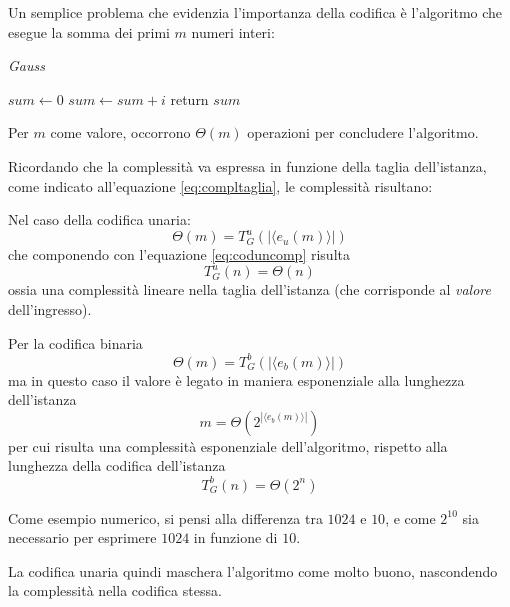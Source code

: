 Un semplice problema che evidenzia l'importanza della codifica è l'algoritmo che esegue la somma dei primi $m$ numeri interi:
\begin{algorithm}[H]
\caption{\emph{Gauss}}\label{alg:gauss}
\begin{algorithmic}[1]
        \State $sum \gets 0$
            \State $sum \gets sum + i$
        \EndFor
        \State return $sum$
    \EndProcedure
\end{algorithmic}
\end{algorithm}
Per $m$ come valore, occorrono $\Theta \left( m \right)$ operazioni per concludere l'algoritmo.

Ricordando che la complessità va espressa in funzione della taglia dell'istanza, come indicato all'equazione \ref{eq:compltaglia}, le complessità risultano:

Nel caso della codifica unaria:
\begin{equation*}
    \Theta \left( m \right) = T_{G}^{u} \left( |\langle e_u(m) \rangle| \right)
\end{equation*}
che componendo con l'equazione \ref{eq:coduncomp} risulta
\begin{equation*}
    T_{G}^{u} \left( n \right) = \Theta\left( n \right)
\end{equation*}
ossia una complessità lineare nella taglia dell'istanza (che corrisponde al \emph{valore} dell'ingresso).

Per la codifica binaria
\begin{equation*}
    \Theta \left( m \right) = T_{G}^{b} \left( |\langle e_b(m) \rangle| \right)
\end{equation*}
ma in questo caso il valore è legato in maniera esponenziale alla lunghezza dell'istanza
\begin{equation*}
    m = \Theta \left( 2^{|\langle e_b(m) \rangle|} \right)
\end{equation*}
per cui risulta una complessità esponenziale dell'algoritmo, rispetto alla lunghezza della codifica dell'istanza
\begin{equation*}
    T_{G}^{b} \left( n \right) = \Theta \left( 2^n \right)
\end{equation*}

Come esempio numerico, si pensi alla differenza tra $1024$ e $10$, e come $2^{10}$ sia necessario per esprimere $1024$ in funzione di $10$.

La codifica unaria quindi maschera l'algoritmo come molto buono, nascondendo la complessità nella codifica stessa.

